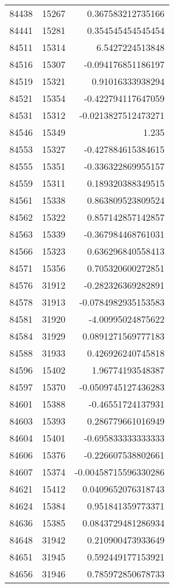 \begin{tabular}{r | r | r}
84438 & 15267 & 0.367583212735166 \\
84441 & 15281 & 0.354545454545454 \\
84511 & 15314 & 6.5427224513848 \\
84516 & 15307 & -0.094176851186197 \\
84519 & 15321 & 0.91016333938294 \\
84521 & 15354 & -0.422794117647059 \\
84531 & 15312 & -0.0213827512473271 \\
84546 & 15349 & 1.235 \\
84553 & 15327 & -0.427884615384615 \\
84555 & 15351 & -0.336322869955157 \\
84559 & 15311 & 0.189320388349515 \\
84561 & 15338 & 0.863809523809524 \\
84562 & 15322 & 0.857142857142857 \\
84563 & 15339 & -0.367984468761031 \\
84566 & 15323 & 0.636296840558413 \\
84571 & 15356 & 0.705320600272851 \\
84576 & 31912 & -0.282326369282891 \\
84578 & 31913 & -0.0784982935153583 \\
84581 & 31920 & -4.00995024875622 \\
84584 & 31929 & 0.0891271569777183 \\
84588 & 31933 & 0.426926240745818 \\
84596 & 15402 & 1.96774193548387 \\
84597 & 15370 & -0.0509745127436283 \\
84601 & 15388 & -0.46551724137931 \\
84603 & 15393 & 0.286779661016949 \\
84604 & 15401 & -0.695833333333333 \\
84606 & 15376 & -0.226607538802661 \\
84607 & 15374 & -0.00458715596330286 \\
84621 & 15412 & 0.0409652076318743 \\
84624 & 15384 & 0.951841359773371 \\
84636 & 15385 & 0.0843729481286934 \\
84648 & 31942 & 0.210900473933649 \\
84651 & 31945 & 0.592449177153921 \\
84656 & 31946 & 0.785972850678733 \\

\end{tabular}
